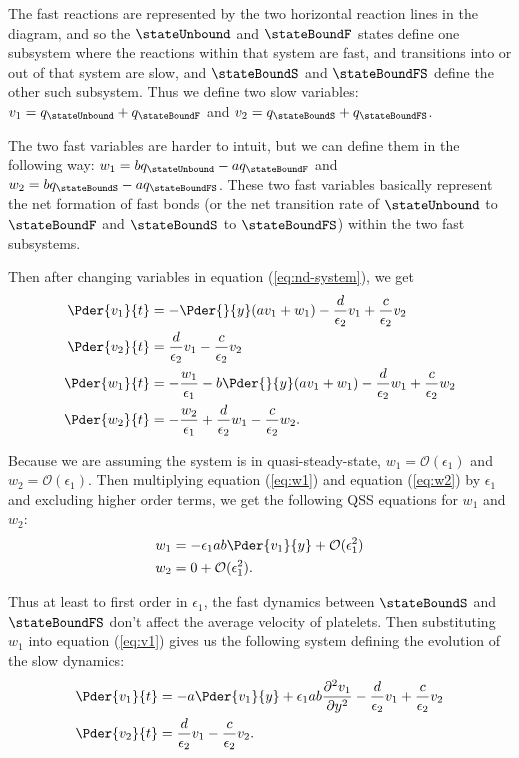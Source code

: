 The fast reactions are represented by the two horizontal reaction
lines in the diagram, and so the $\stateUnbound$ and $\stateBoundF$
states define one subsystem where the reactions within that system are
fast, and transitions into or out of that system are slow, and
$\stateBoundS$ and $\stateBoundFS$ define the other such
subsystem. Thus we define two slow variables:
$v_1 = q_\stateUnbound + q_\stateBoundF$ and
$v_2 = q_\stateBoundS + q_\stateBoundFS$.

The two fast variables are harder to intuit, but we can define them in
the following way:
$w_1 = b q_\stateUnbound - a q_\stateBoundF$ and
$w_2 = b q_\stateBoundS - a q_\stateBoundFS$. These two fast variables
basically represent the net formation of fast bonds (or the net
transition rate of $\stateUnbound$ to $\stateBoundF$ and
$\stateBoundS$ to $\stateBoundFS$) within the two fast subsystems.

Then after changing variables in equation (\ref{eq:nd-system}), we
get
\begin{align}
  \Pder{v_1}{t} &= -\Pder{}{y}(a v_1 + w_1) - \frac{d}{\epsilon_2} v_1
                  + \frac{c}{\epsilon_2} v_2 \label{eq:v1} \\
  \Pder{v_2}{t} &= \frac{d}{\epsilon_2} v_1 - \frac{c}{\epsilon_2} v_2
  \label{eq:v2} \\
  \Pder{w_1}{t} &= -\frac{w_1}{\epsilon_1} - b\Pder{}{y} (a v_1 + w_1)
                  - \frac{d}{\epsilon_2} w_1 + \frac{c}{\epsilon_2}
                  w_2 \label{eq:w1} \\
  \Pder{w_2}{t} &= -\frac{w_2}{\epsilon_1} + \frac{d}{\epsilon_2} w_1
                  - \frac{c}{\epsilon_2} w_2. \label{eq:w2}
\end{align}

Because we are assuming the system is in quasi-steady-state,
$w_1 = \mathcal{O}(\epsilon_1)$ and $w_2 =
\mathcal{O}(\epsilon_1)$. Then multiplying equation (\ref{eq:w1}) and
equation (\ref{eq:w2}) by $\epsilon_1$ and excluding higher order terms,
we get the following QSS equations for $w_1$ and $w_2$:
\begin{align}
  \label{eq:w1-reduced}
  w_1 &= -\epsilon_1 a b \Pder{v_1}{y} + \mathcal{O}(\epsilon_1^2) \\
  \label{eq:w2-reduced}
  w_2 &= 0 + \mathcal{O}(\epsilon_1^2).
\end{align}

Thus at least to first order in $\epsilon_1$, the fast dynamics
between $\stateBoundS$ and $\stateBoundFS$ don't affect the average
velocity of platelets. Then substituting $w_1$ into equation
(\ref{eq:v1}) gives us the following system defining the evolution of
the slow dynamics:
\begin{align}
  \label{eq:v1-reduced}
  \Pder{v_1}{t} &= -a \Pder{v_1}{y} + \epsilon_1 a b \frac{\partial^2
                  v_1}{\partial y^2} - \frac{d}{\epsilon_2} v_1 +
                  \frac{c}{\epsilon_2} v_2 \\
  \label{eq:v2-reduced}
  \Pder{v_2}{t} &= \frac{d}{\epsilon_2} v_1 - \frac{c}{\epsilon_2} v_2.
\end{align}


